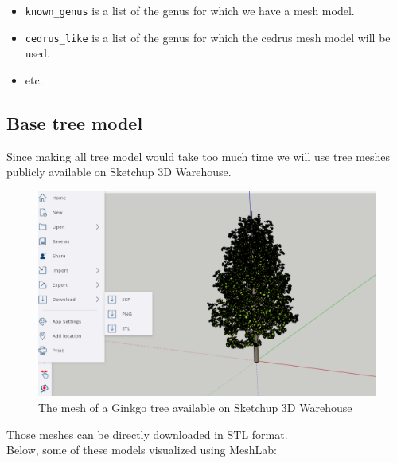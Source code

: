 \documentclass[12pt]{article}
\begin{document}
\begin{itemize}
    \item \texttt{known\_genus} is a list of the genus for which we have a mesh model.
    \item \texttt{cedrus\_like} is a list of the genus for which the cedrus mesh model will be used.
    \item etc.
\end{itemize}

\subsection{Base tree model}
Since making all tree model would take too much time we will use tree meshes
publicly available on Sketchup\cite{sketchup} 3D Warehouse.

\begin{figure}[H]
    \centering
        \centering
        \includegraphics[width=\textwidth]{images/ginkgo_sketchup.png}
        \caption{The mesh of a Ginkgo tree available on Sketchup 3D Warehouse}
\end{figure}

Those meshes can be directly downloaded in STL format\cite{stl_format}.  \\
Below, some of these models visualized using MeshLab\cite{meshlab}:
\end{document}
